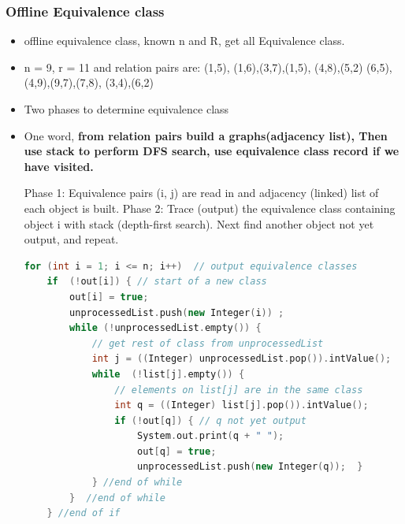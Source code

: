 \documentclass[a4paper,11pt,twoside]{book}
\begin{document}
\subsubsection{Offline Equivalence class}
\begin{itemize}
	\item offline equivalence class, known n and R, get all Equivalence class. 
	
	\item n = 9, r = 11 and relation pairs are:
	(1,5), (1,6),(3,7),(1,5), (4,8),(5,2)
	(6,5), (4,9),(9,7),(7,8), (3,4),(6,2)
	
	\item Two phases to determine equivalence class
	
	\item One word, \textbf{from relation pairs build a graphs(adjacency list), Then use stack to perform DFS search, use equivalence class record if we have visited.}
	
	
	
	Phase 1: Equivalence pairs (i, j) are read in and adjacency (linked) list of each object is built.
	Phase 2: Trace (output) the equivalence class containing object i with stack (depth-first search). Next find another object not yet output, and repeat.
	
\begin{lstlisting}[frame=single, language=c++, basicstyle=\scriptsize]
	for (int i = 1; i <= n; i++)  // output equivalence classes
	if  (!out[i]) { // start of a new class
		out[i] = true;
		unprocessedList.push(new Integer(i)) ;
		while (!unprocessedList.empty()) { 
			// get rest of class from unprocessedList
			int j = ((Integer) unprocessedList.pop()).intValue();
			while  (!list[j].empty()) { 
				// elements on list[j] are in the same class
				int q = ((Integer) list[j].pop()).intValue();
				if (!out[q]) { // q not yet output
					System.out.print(q + " ");
					out[q] = true;
					unprocessedList.push(new Integer(q));  }
			} //end of while
		}  //end of while 
	} //end of if
\end{lstlisting}		


\end{itemize}
\end{document}
